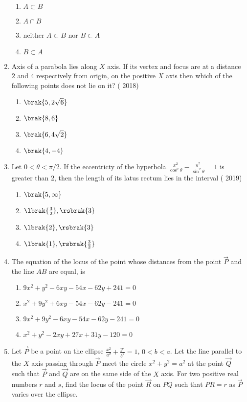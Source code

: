 \begin{enumerate}
\begin{multicols}{2}
\begin{enumerate}
		\item $A\subset B$ 
		\item $A\cap B$
		\item neither $A\subset B$ nor $B\subset A$
		\item $B\subset A$
	\end{enumerate}\end{multicols}
\item Axis of a parabola lies along $X$ axis. If its vertex and focus are at a distance $2$ and $4$ respectively from origin, on the positive $X$ axis then which of the following points does not lie on it? 
     \hfill{( 2018)} 
				\begin{multicols}{4}
	\begin{enumerate}
    		\item $\brak{5,2\sqrt6}$
    		\item $\brak{8,6}$
    		\item $\brak{6,4\sqrt2}$
    		\item $\brak{4,-4}$
	\end{enumerate}\end{multicols}
\item Let $0<\theta<\pi/2$. If the eccentricty of the hyperbola $\frac{x^2}{\cos^2{\theta}} - \frac{y^2}{\sin^2{\theta}} = 1$ is greater than $2$, then the length of its latus rectum lies in the interval
	\hfill{( 2019)}
					\begin{multicols}{4}
	\begin{enumerate}
    		\item $\brak{5,\infty}$
    		\item $\lbrak{\frac{3}{2}},\rsbrak{3}$
    		\item $\lbrak{2},\rsbrak{3}$ 
    		\item $\lbrak{1},\rsbrak{\frac{3}{2}}$
	\end{enumerate} \end{multicols}
\item  The equation of the locus of the point whose distances from the point $\Vec{P}$ and the line $AB$ are equal, is

	\begin{multicols}{2}
\begin{enumerate}
     \item $9x^2+y^2-6xy-54x-62y+241=0$
     \item $x^2+9y^2+6xy-54x-62y-241=0$
     \item $9x^2+9y^2-6xy-54x-62y-241=0$
     \item $x^2+y^2-2xy+27x+31y-120=0$
\end{enumerate}\end{multicols}
\item Let $\vec{P}$ be a point on the ellipse $\frac{x^2}{a^2}+\frac{y^2}{b^2}=1$, $0<b<a$. Let the line parallel to the $X$ axis passing through $\vec{P}$ meet the circle $x^2+y^2=a^2$ at the point $\vec{Q}$ such that $\vec{P}$ and $\vec{Q}$ are on the same side of the $X$ axis. For two positive real numbers $r$ and $s$, find the locus of the point $\vec{R}$ on $PQ$ such that $PR
= r$ as $\vec{P}$ varies over the ellipse. \hfill{}


	\end{enumerate}
